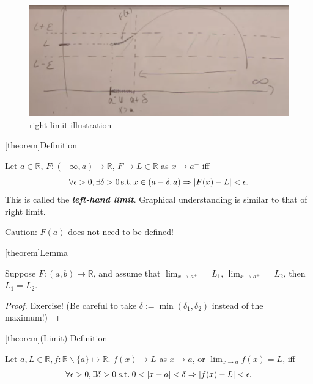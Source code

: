 \documentclass[12pt]{report}
\theoremstyle{definition}
\begin{document}
\begin{figure}
  	\includegraphics[scale=0.5]{rightLimit.png}
  	\centering
    \caption{right limit illustration}\label{fig:rightLimit}
\end{figure}

[theorem]{Definition}
\begin{left limit}
    Let $a \in \mathbb{R}$, $F: (-\infty, a) \mapsto \mathbb{R}$, $F \rightarrow{}L \in \mathbb{R}$
    as $x \rightarrow{}a^{-}$ iff\[
        \forall \epsilon > 0, \exists \delta > 0 \,\textnormal{s.t.}\,
        x \in (a - \delta, a) \Rightarrow{}|F(x) - L| < \epsilon.
    \]
    This is called the \textbf{\emph{left-hand limit}}.
    Graphical understanding is similar to that of right limit.
\end{left limit}

\underline{Caution}: $F(a)$ does not need to be defined!

[theorem]{Lemma}
\begin{left and right limit are equal}
    Suppose $F:(a,b) \mapsto \mathbb{R}$, and assume that $\lim_{x \rightarrow{}a^{+}} = L_1$,
    $\lim_{x \rightarrow{}a^{+}} = L_2$, then $L_1 = L_2$.
\end{left and right limit are equal}

\begin{proof}
    Exercise! (Be careful to take $\delta := \min{(\delta_1, \delta_2)}$
    instead of the maximum!)
\end{proof}

[theorem]{(Limit) Definition}
\begin{limit definition}
    Let $a,L \in\mathbb{R}, f:\mathbb{R}\backslash\{a\}\mapsto\mathbb{R}$.
    $f(x)\rightarrow{}L$ as $x\rightarrow{}a$,
    or $\lim_{x\rightarrow{}a}f(x) = L$, iff\[
        \forall \epsilon>0, \exists \delta>0 \;\textnormal{s.t.}\;
        0<|x-a|<\delta \Rightarrow{}|f(x)-L|<\epsilon.
    \]
\end{limit definition}
\end{document}
